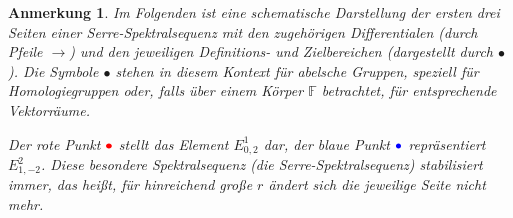\documentclass[12pt, hidelinks]{article}
\numberwithin{conj}{section}
\newtheorem{remark}[conj]{Anmerkung}
\begin{document}
\begin{remark}
    Im Folgenden ist eine schematische Darstellung der ersten drei Seiten einer Serre-Spektralsequenz mit den zugehörigen Differentialen (durch Pfeile $\rightarrow$) und den jeweiligen Definitions- und Zielbereichen (dargestellt durch $\bullet$). Die Symbole $\bullet$ stehen in diesem Kontext für abelsche Gruppen, speziell für Homologiegruppen oder, falls über einem Körper $\mathbb{F}$ betrachtet, für entsprechende Vektorräume. 

    Der rote Punkt $\color{red}\bullet$ stellt das Element $E^1_{0,2}$ dar, der blaue Punkt $\color{blue}\bullet$ repräsentiert $E^2_{1,-2}$. Diese besondere Spektralsequenz (die Serre-Spektralsequenz) \emph{stabilisiert} immer, das heißt, für hinreichend große $r$ ändert sich die jeweilige Seite nicht mehr.


\end{remark}
\end{document}
